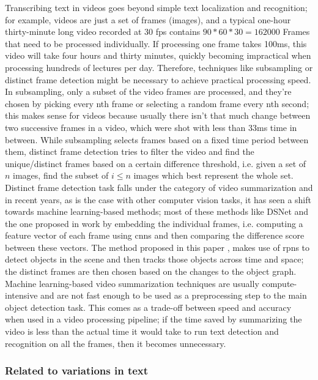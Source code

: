 Transcribing text in videos goes beyond simple text localization and recognition; for example, videos are just a set of frames (images), and a typical one-hour thirty-minute long video recorded at 30 \gls{fps} contains $90 * 60 * 30 = 162000$ Frames that need to be processed individually. If processing one frame takes 100ms, this video will take four hours and thirty minutes, quickly becoming impractical when processing hundreds of lectures per day. Therefore, techniques like subsampling or distinct frame detection might be necessary to achieve practical processing speed. In subsampling, only a subset of the video frames are processed, and they're chosen by picking every nth frame or selecting a random frame every nth second; this makes sense for videos because usually there isn't that much change between two successive frames in a video, which were shot with less than 33ms time in between. While subsampling selects frames based on a fixed time period between them, distinct frame detection tries to filter the video and find the unique/distinct frames based on a certain difference threshold, i.e. given a set of $n$ images, find the subset of $i \leq n $ images which best represent the whole set. Distinct frame detection task falls under the category of video summarization and in recent years, as is the case with other computer vision tasks, it has seen a shift towards machine learning-based methods; most of these methods like DSNet \cite{zhu_dsnet_2021} and the one proposed in \cite{apostolidis_combining_2021} work by embedding the individual frames, i.e. computing a feature vector of each frame using \gls{cnn}s and then comparing the difference score between these vectors. The method proposed in this paper \cite{zhu_relational_2022}, makes use of \gls{rpn}s to detect objects in the scene and then tracks those objects across time and space; the distinct frames are then chosen based on the changes to the object graph. Machine learning-based video summarization techniques are usually compute-intensive and are not fast enough to be used as a preprocessing step to the main object detection task. This comes as a trade-off between speed and accuracy when used in a video processing pipeline; if the time saved by summarizing the video is less than the actual time it would take to run text detection and recognition on all the frames, then it becomes unnecessary. 

\subsubsection*{Related to variations in text}

